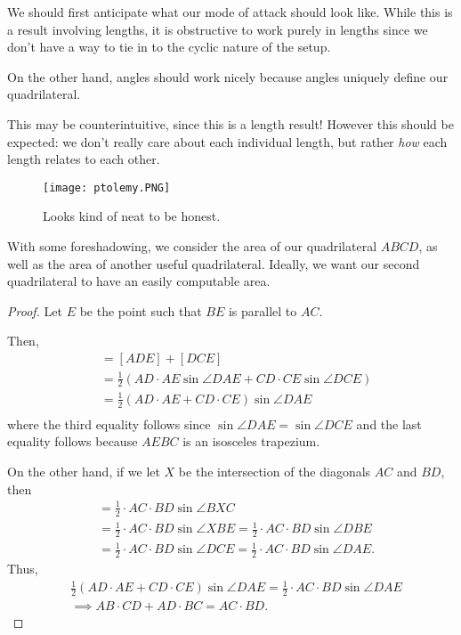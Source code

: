\documentclass[../jarvis.tex]{subfiles}
\begin{document}
We should first anticipate what our mode of attack should look like. While this is a result involving lengths, it is obstructive to work purely in lengths since we don't have a way to tie in to the cyclic nature of the setup.

On the other hand, angles should work nicely because angles uniquely define our quadrilateral.
\begin{remark}
    This may be counterintuitive, since this is a length result! However this should be expected: we don't really care about each individual length, but rather \textit{how} each length relates to each other.
\end{remark} 
\begin{figure}[H]
    \centering
    \texttt{[image: ptolemy.PNG]}
    \caption{Looks kind of neat to be honest.}
\end{figure}
With some foreshadowing, we consider the area of our quadrilateral $ABCD$, as well as the area of another useful quadrilateral. Ideally, we want our second quadrilateral to have an easily computable area. 
\begin{proof}
    Let $E$ be the point such that $BE$ is parallel to $AC$.
    
    Then,
    \begin{align*}
        [ABCD]&=[ADE]+[DCE] \\
        &=\frac{1}{2}\left(AD\cdot AE\sin{\angle DAE}+CD\cdot CE\sin{\angle DCE}\right) \\
        &=\frac{1}{2}\left(AD\cdot AE+CD\cdot CE\right)\sin{\angle DAE} \\
    \end{align*}
    where the third equality follows since $\sin{\angle DAE}=\sin{\angle DCE}$ and the last equality follows because $AEBC$ is an isosceles trapezium.
    
    On the other hand, if we let $X$ be the intersection of the diagonals $AC$ and $BD$, then 
    \begin{align*}
        [ABCD]&=\frac{1}{2}\cdot AC\cdot BD \sin{\angle BXC} \\
        &=\frac{1}{2}\cdot AC\cdot BD\sin{\angle XBE}= \frac{1}{2}\cdot AC\cdot BD\sin{\angle DBE} \\
        &=\frac{1}{2}\cdot AC\cdot BD\sin{\angle DCE}=\frac{1}{2}\cdot AC\cdot BD\sin{\angle DAE}.
    \end{align*}
    Thus, \begin{align*}
        &\frac{1}{2}\left(AD\cdot AE+CD\cdot CE\right)\sin{\angle DAE}=\frac{1}{2}\cdot AC\cdot BD\sin{\angle DAE} \\
        &\implies AB\cdot CD+AD\cdot BC=AC\cdot BD.
    \end{align*}
\end{proof}
\end{document}

